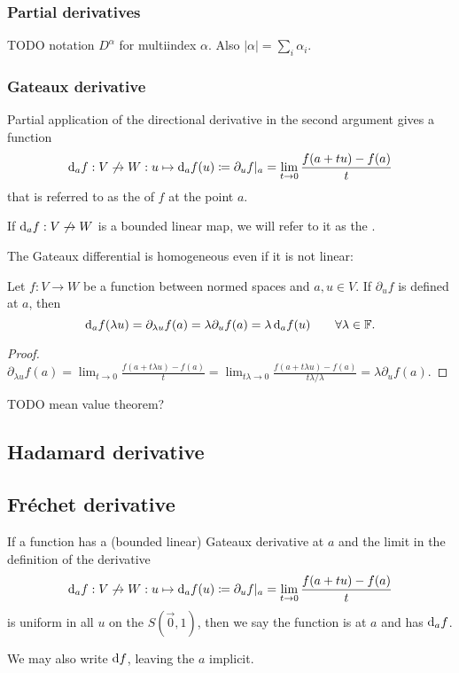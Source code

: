 \subsubsection{Partial derivatives}
TODO notation $D^\alpha$ for multiindex $\alpha$. Also $|\alpha| = \sum_i \alpha_i$.

\subsubsection{Gateaux derivative}
\begin{definition}
Partial application of the directional derivative in the second argument gives a function
\[ \operatorname{d \!}{_af}: V\not\to W: u\mapsto \operatorname{d \!}{_af}(u) \coloneqq \partial_u f|_a = \lim_{t\to 0} \frac{f(a+tu) - f(a)}{t} \]
that is referred to as the  of $f$ at the point $a$.

If $\operatorname{d \!}{_af}: V\not\to W$ is a bounded linear map, we will refer to it as the .
\end{definition}
The Gateaux differential is homogeneous even if it is not linear:
\begin{lemma}
Let $f:V\to W$ be a function between normed spaces and $a,u\in V$. If $\partial_u f$ is defined at $a$, then
\[ \operatorname{d \!}{_a f}(\lambda u) = \partial_{\lambda u}f(a) = \lambda\partial_u f(a) = \lambda \operatorname{d \!}{_a f}(u) \qquad \forall \lambda\in\mathbb{F}. \]
\end{lemma}
\begin{proof}
$\partial_{\lambda u}f(a) = \lim_{t\to 0} \frac{f(a+t\lambda u) - f(a)}{t} = \lim_{t\lambda\to 0} \frac{f(a+t\lambda u) - f(a)}{t \lambda / \lambda} = \lambda\partial_u f(a)$.
\end{proof}

TODO mean value theorem?

\subsection{Hadamard derivative}

\subsection{Fréchet derivative}
\begin{definition}
If a function has a (bounded linear) Gateaux derivative at $a$ and the limit in the definition of the derivative
\[ \operatorname{d \!}{_af}: V\not\to W: u\mapsto \operatorname{d \!}{_af}(u) \coloneqq \partial_u f|_a = \lim_{t\to 0} \frac{f(a+tu) - f(a)}{t} \]
is uniform in all $u$ on the $S(\vec{0},1)$, then we say the function is  at $a$ and has  $\operatorname{d \!}{_af}$.

We may also write $\operatorname{d \!}{f}$, leaving the $a$ implicit.
\end{definition}

